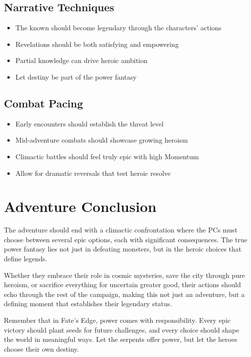 \documentclass[12pt,twoside]{article}
\begin{document}
\subsection{Narrative Techniques}

\begin{itemize}
  \item The known should become legendary through the characters' actions
  \item Revelations should be both satisfying and empowering
  \item Partial knowledge can drive heroic ambition
  \item Let destiny be part of the power fantasy
\end{itemize}

\subsection{Combat Pacing}

\begin{itemize}
  \item Early encounters should establish the threat level
  \item Mid-adventure combats should showcase growing heroism
  \item Climactic battles should feel truly epic with high Momentum
  \item Allow for dramatic reversals that test heroic resolve
\end{itemize}

\section{Adventure Conclusion}

The adventure should end with a climactic confrontation where the PCs must choose between several epic options, each with significant consequences. The true power fantasy lies not just in defeating monsters, but in the heroic choices that define legends.

Whether they embrace their role in cosmic mysteries, save the city through pure heroism, or sacrifice everything for uncertain greater good, their actions should echo through the rest of the campaign, making this not just an adventure, but a defining moment that establishes their legendary status.

Remember that in Fate's Edge, power comes with responsibility. Every epic victory should plant seeds for future challenges, and every choice should shape the world in meaningful ways. Let the serpents offer power, but let the heroes choose their own destiny.
\end{document}

